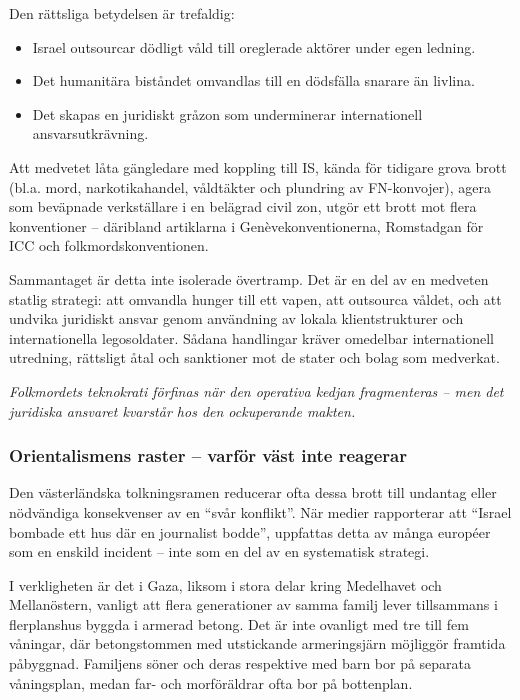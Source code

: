 Den rättsliga betydelsen är trefaldig:
\begin{itemize}
  \item Israel outsourcar dödligt våld till oreglerade aktörer under egen ledning.
  \item Det humanitära biståndet omvandlas till en dödsfälla snarare än livlina.
  \item Det skapas en juridiskt gråzon som underminerar internationell ansvarsutkrävning.
\end{itemize}

Att medvetet låta gängledare med koppling till IS, kända för tidigare grova brott (bl.a. mord, narkotikahandel, våldtäkter och plundring av FN-konvojer), agera som beväpnade verkställare i en belägrad civil zon, utgör ett brott mot flera konventioner – däribland artiklarna i Genèvekonventionerna, Romstadgan för ICC och folkmordskonventionen.

Sammantaget är detta inte isolerade övertramp. Det är en del av en medveten statlig strategi: att omvandla hunger till ett vapen, att outsourca våldet, och att undvika juridiskt ansvar genom användning av lokala klientstrukturer och internationella legosoldater. Sådana handlingar kräver omedelbar internationell utredning, rättsligt åtal och sanktioner mot de stater och bolag som medverkat.

\textit{Folkmordets teknokrati förfinas när den operativa kedjan fragmenteras – men det juridiska ansvaret kvarstår hos den ockuperande makten.}







\subsubsection*{Orientalismens raster – varför väst inte reagerar}
Den västerländska tolkningsramen reducerar ofta dessa brott till undantag eller nödvändiga konsekvenser av en \enquote{svår konflikt}. När medier rapporterar att \enquote{Israel bombade ett hus där en journalist bodde}, uppfattas detta av många européer som en enskild incident – inte som en del av en systematisk strategi.

I verkligheten är det i Gaza, liksom i stora delar kring Medelhavet och Mellanöstern, vanligt att flera generationer av samma familj lever tillsammans i flerplanshus byggda i armerad betong. Det är inte ovanligt med tre till fem våningar, där betongstommen med utstickande armeringsjärn möjliggör framtida påbyggnad. Familjens söner och deras respektive med barn bor på separata våningsplan, medan far- och morföräldrar ofta bor på bottenplan.

